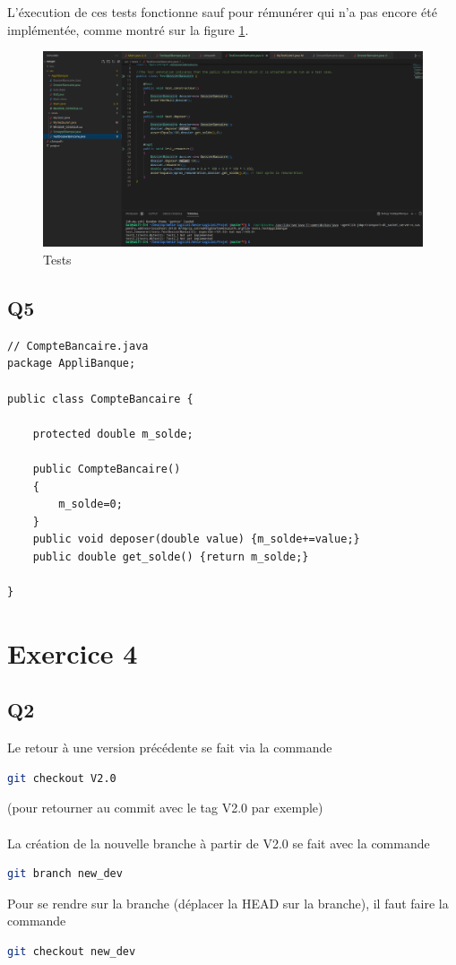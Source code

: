 \documentclass[12pt]{article}
\begin{document}
L'éxecution de ces tests fonctionne sauf pour rémunérer qui n'a pas encore été implémentée, comme montré sur la figure \ref{ScreenE3Q31}.
\begin{figure}[h]
    \centering
    \includegraphics[width=\textwidth]{img/Screenshots/E3_Q3_1.png}
    \caption{Tests\label{ScreenE3Q31}}
\end{figure}

\subsection{Q5}

\begin{lstlisting}
// CompteBancaire.java
package AppliBanque;

public class CompteBancaire {

    protected double m_solde;

    public CompteBancaire()
    {
        m_solde=0;
    }
    public void deposer(double value) {m_solde+=value;}
    public double get_solde() {return m_solde;}

}
\end{lstlisting}

\section{Exercice 4}
\subsection{Q2}

Le retour à une version précédente se fait via la commande
\begin{lstlisting}[language=bash]
git checkout V2.0
\end{lstlisting}
(pour retourner au commit avec le tag V2.0 par exemple)\\ \\
La création de la nouvelle branche à partir de V2.0 se fait avec la commande
\begin{lstlisting}[language=bash]
git branch new_dev
\end{lstlisting}
Pour se rendre sur la branche (déplacer la HEAD sur la branche), il faut faire la commande
\begin{lstlisting}[language=bash]
git checkout new_dev
\end{lstlisting}
\end{document}

